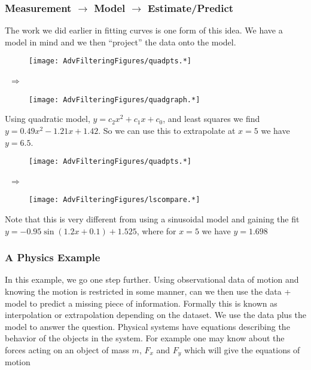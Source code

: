 \hypertarget{measurement-to-model-to-estimatepredict}{%
\subsubsection{\texorpdfstring{Measurement \(\to\) Model \(\to\)
Estimate/Predict}{Measurement \textbackslash to Model \textbackslash to Estimate/Predict}}\label{measurement-to-model-to-estimatepredict}}

The work we did earlier in fitting curves is one form of this idea. We
have a model in mind and we then ``project'' the data onto the model.

\begin{figure}
\centering
\texttt{[image: AdvFilteringFigures/quadpts.*]}
\caption{}
\end{figure}

~\(\Rightarrow\)

\begin{figure}
\centering
\texttt{[image: AdvFilteringFigures/quadgraph.*]}
\caption{}
\end{figure}

Using quadratic model, \(y = c_2x^2 + c_1x + c_0\), and least squares we
find \(y = 0.49x^2 - 1.21x + 1.42\). So we can use this to extrapolate
at \(x=5\) we have \(y = 6.5\).

\begin{figure}
\centering
\texttt{[image: AdvFilteringFigures/quadpts.*]}
\caption{}
\end{figure}

~\(\Rightarrow\)

\begin{figure}
\centering
\texttt{[image: AdvFilteringFigures/lscompare.*]}
\caption{}
\end{figure}

Note that this is very different from using a sinusoidal model and
gaining the fit \(y= -0.95\sin(1.2x+0.1)+1.525\), where for \(x=5\) we
have \(y=1.698\)

\hypertarget{a-physics-example}{%
\subsubsection{A Physics Example}\label{a-physics-example}}

In this example, we go one step further. Using observational data of
motion and knowing the motion is restricted in some manner, can we then
use the data + model to predict a missing piece of information. Formally
this is known as interpolation or extrapolation depending on the
dataset. We use the data plus the model to answer the question. Physical
systems have equations describing the behavior of the objects in the
system. For example one may know about the forces acting on an object of
mass \(m\), \(F_x\) and \(F_y\) which will give the equations of motion

